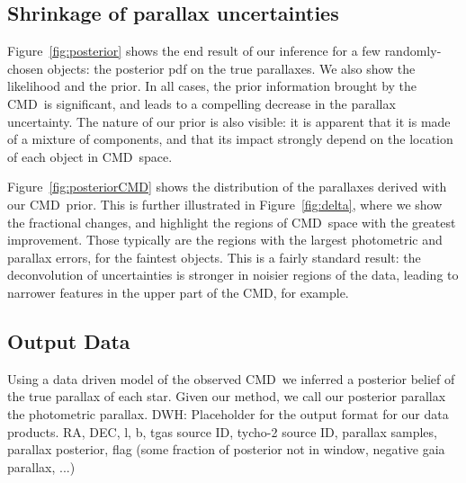 \documentclass[modern]{aastex61}
\newcommand\BLcomment[1]{{\color{cyan}{[BL: #1]}}}
\newcommand{\acronym}[1]{{\small{#1}}}
\newcommand{\cmd}{\acronym{CMD}}
\begin{document}
\subsection{Shrinkage of parallax uncertainties}

Figure~\ref{fig:posterior} shows the end result of our inference for a few randomly-chosen objects: the posterior pdf on the true parallaxes.
We also show the likelihood and the prior.
In all cases, the prior information brought by the \cmd\ is significant, and leads to a compelling decrease in the parallax uncertainty.
The nature of our prior is also visible: it is apparent that it is made of a mixture of components, and that its impact strongly depend on the location of each object in \cmd\ space.

Figure~\ref{fig:posteriorCMD} shows the distribution of the parallaxes derived with our \cmd\ prior.
This is further illustrated in Figure~\ref{fig:delta}, where we show the fractional changes, and highlight the regions of \cmd\ space with the greatest improvement.
Those typically are the regions with the largest photometric and parallax errors, for the faintest objects.
This is a fairly standard result: the deconvolution of uncertainties is stronger in noisier regions of the data, leading to narrower features in the upper part of the \cmd, for example.

\BLcomment{Need to discuss the implications of that.}

\subsection{Output Data}
Using a data driven model of the observed \cmd\ we inferred a posterior belief of the true parallax of each star. Given our method, we call our posterior parallax the photometric parallax.
DWH: Placeholder for the output format for our data products.
RA, DEC, l, b, tgas source ID, tycho-2 source ID, parallax samples, parallax posterior, flag (some fraction of posterior not in window, negative gaia parallax, ...)


\end{document}
